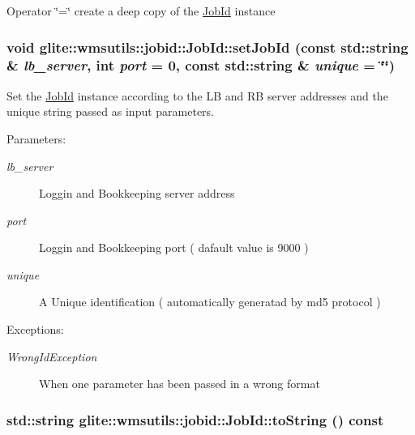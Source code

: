 Operator \char`\"{}=\char`\"{} create a deep copy of the \hyperlink{classglite_1_1wmsutils_1_1jobid_1_1JobId}{Job\-Id} instance \hypertarget{classglite_1_1wmsutils_1_1jobid_1_1JobId_z3_2}{
\subsubsection[setJobId]{\setlength{\rightskip}{0pt plus 5cm}void glite::wmsutils::jobid::Job\-Id::set\-Job\-Id (const std::string \& {\em lb\_\-server}, int {\em port} = 0, const std::string \& {\em unique} = \char`\"{}\char`\"{})}}
\label{classglite_1_1wmsutils_1_1jobid_1_1JobId_z3_2}


Set the \hyperlink{classglite_1_1wmsutils_1_1jobid_1_1JobId}{Job\-Id} instance according to the LB and RB server addresses and the unique string passed as input parameters. \begin{Desc}
\item[Parameters:]
\begin{description}
\item[{\em lb\_\-server}]Loggin and Bookkeeping server address \item[{\em port}]Loggin and Bookkeeping port ( dafault value is 9000 ) \item[{\em unique}]A Unique identification ( automatically generatad by md5 protocol ) \end{description}
\end{Desc}
\begin{Desc}
\item[Exceptions:]
\begin{description}
\item[{\em Wrong\-Id\-Exception}]When one parameter has been passed in a wrong format \end{description}
\end{Desc}
\hypertarget{classglite_1_1wmsutils_1_1jobid_1_1JobId_a1}{
\subsubsection[toString]{\setlength{\rightskip}{0pt plus 5cm}std::string glite::wmsutils::jobid::Job\-Id::to\-String () const}}
\label{classglite_1_1wmsutils_1_1jobid_1_1JobId_a1}


